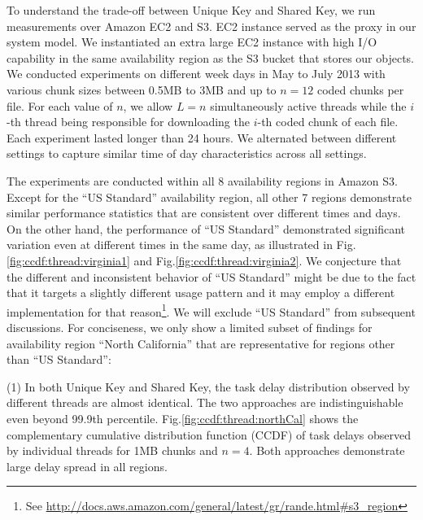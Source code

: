 \documentclass[journal]{IEEEtran}
\begin{document}
To understand the trade-off between Unique Key and Shared Key, we run measurements over Amazon EC2 and S3. EC2 instance served as the proxy in our system model. We instantiated an extra large EC2 instance with high I/O capability in the same availability region as the S3 bucket that stores our objects. We conducted experiments on different week days in May to July 2013 with various chunk sizes between 0.5MB to 3MB and up to $n=12$ coded chunks per file. For each value of $n$, we allow $L=n$ simultaneously active threads while the $i$-th thread being responsible for downloading the $i$-th coded chunk of each file. Each experiment lasted longer than 24 hours. We alternated between different settings to capture similar time of day characteristics across all settings. 


The experiments are conducted within all 8  availability regions in Amazon S3. 
Except for the ``US Standard'' availability region, all other 7 regions demonstrate similar performance statistics that are consistent over different times and days. On the other hand, the performance of ``US Standard'' demonstrated significant variation even at different times in the same day, as illustrated in Fig.\ref{fig:ccdf:thread:virginia1} and Fig.\ref{fig:ccdf:thread:virginia2}. We conjecture that the different and inconsistent behavior of ``US Standard'' might be due to the fact that it targets a slightly different usage pattern and it may employ a different implementation for that reason\footnote{See \url{http://docs.aws.amazon.com/general/latest/gr/rande.html#s3_region}}. We will exclude ``US Standard'' from subsequent discussions. 
For conciseness, we only show a limited subset of findings for availability region ``North California'' that are representative for regions other than ``US Standard'':




(1)
\label{obs:identicalDistribution} 
In both Unique Key and Shared Key, the task delay distribution observed by different threads are almost identical. The two approaches are indistinguishable  even beyond 99.9th percentile. Fig.\ref{fig:ccdf:thread:northCal} shows the complementary cumulative distribution function (CCDF) of task delays observed by individual threads for 1MB chunks and $n=4$. Both approaches demonstrate large delay spread in all regions. 
\end{document}
